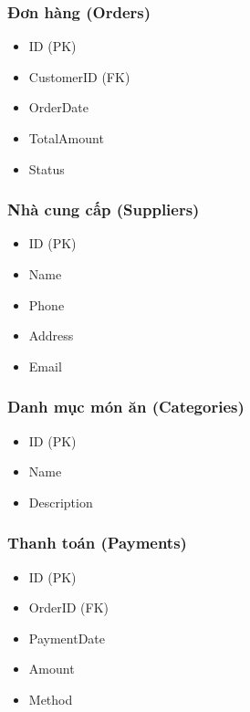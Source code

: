 \documentclass{article}
\begin{document}
\subsubsection{Đơn hàng (Orders)}

\begin{itemize}
    \item ID (PK)
    \item CustomerID (FK)
    \item OrderDate
    \item TotalAmount
    \item Status
\end{itemize}

\subsubsection{Nhà cung cấp (Suppliers)}

\begin{itemize}
    \item ID (PK)
    \item Name
    \item Phone
    \item Address
    \item Email
\end{itemize}

\subsubsection{Danh mục món ăn (Categories)}

\begin{itemize}
    \item ID (PK)
    \item Name
    \item Description
\end{itemize}

\subsubsection{Thanh toán (Payments)}

\begin{itemize}
    \item ID (PK)
    \item OrderID (FK)
    \item PaymentDate
    \item Amount
    \item Method
\end{itemize}
\end{document}
